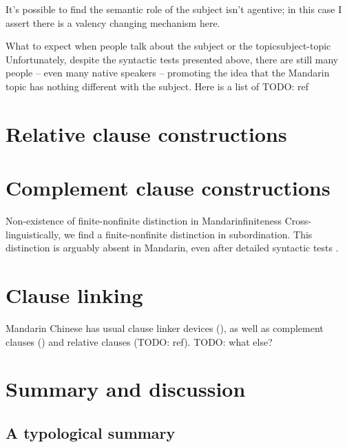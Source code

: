 \documentclass[UTF8, a4paper, oneside, scheme=plain, 12pt]{ctexrep}
\begin{document}
It's possible to find the semantic role of the subject isn't agentive;
in this case I assert there is a valency changing mechanism here.

\begin{infobox}{What to expect when people talk about the subject or the topic}{subject-topic}
    Unfortunately, despite the syntactic tests presented above,
    there are still many people -- even many native speakers -- 
    promoting the idea that the Mandarin topic has nothing different with the subject.
    Here is a list of TODO: ref
\end{infobox}

\chapter{Relative clause constructions}





\chapter{Complement clause constructions}\label{sec:complement-clause}


\begin{infobox}{Non-existence of finite-nonfinite distinction in Mandarin}{finiteness}
    Cross-linguistically, we find a finite-nonfinite distinction in subordination.
    This distinction is arguably absent in Mandarin,
    even after detailed syntactic tests \citep{no-finite}.
\end{infobox}

\chapter{Clause linking}\label{chap:clause-linking}

Mandarin Chinese has usual clause linker devices (),
as well as complement clauses ()
and relative clauses (TODO: ref). TODO: what else?

\chapter{Summary and discussion}

\section{A typological summary}
\end{document}
